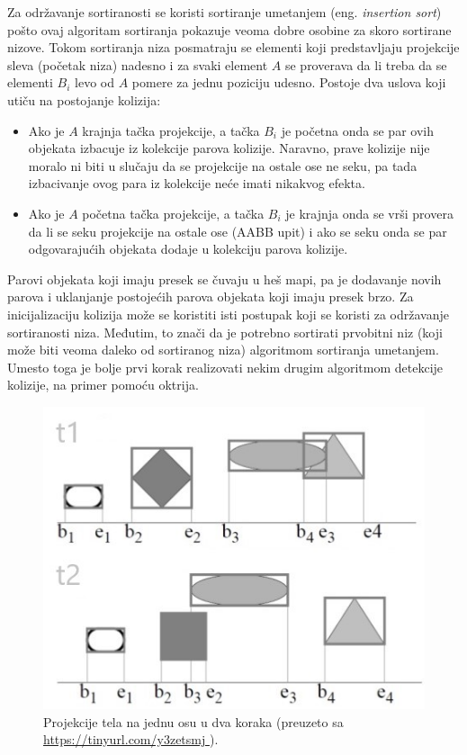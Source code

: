 \documentclass[12pt,oneside]{memoir}
\begin{document}
Za održavanje sortiranosti se koristi sortiranje umetanjem (eng. {\em insertion sort}) 
pošto ovaj algoritam sortiranja pokazuje veoma dobre osobine za skoro sortirane nizove.
Tokom sortiranja niza posmatraju se elementi koji predstavljaju projekcije sleva (početak niza) nadesno i za svaki element $A$ se proverava da li treba da se elementi $B_i$ levo od $A$
pomere za jednu poziciju udesno. Postoje dva uslova koji utiču na postojanje kolizija:
\begin{itemize}  
	\item Ako je $A$ krajnja tačka projekcije, a tačka $B_i$ je početna onda se par ovih objekata izbacuje iz kolekcije parova kolizije.
	Naravno, prave kolizije nije moralo ni biti u slučaju da se projekcije na ostale ose ne seku, 
	pa tada izbacivanje ovog para iz kolekcije neće imati nikakvog efekta.
	\item Ako je $A$ početna tačka projekcije, a tačka $B_i$ je krajnja onda se vrši provera da li se seku projekcije na ostale ose (AABB upit) i ako se seku
	onda se par odgovarajućih objekata dodaje u kolekciju parova kolizije.

\end{itemize}  

Parovi objekata koji imaju presek se čuvaju u heš mapi, pa je dodavanje novih parova i uklanjanje postojećih parova objekata koji imaju presek brzo.
Za inicijalizaciju kolizija može se koristiti isti postupak koji se koristi za održavanje sortiranosti niza.
Međutim, to znači da je potrebno sortirati prvobitni niz (koji može biti veoma daleko od sortiranog niza) algoritmom sortiranja umetanjem.
Umesto toga je bolje prvi korak realizovati nekim drugim algoritmom detekcije kolizije, na primer pomoću oktrija.

\begin{figure}[h!]
	\centering
	\includegraphics[scale=0.8]{sap.jpg}
	\caption{Projekcije tela na jednu osu u dva koraka (preuzeto sa \url{ https://tinyurl.com/y3zetsmj }).}
	
	\label{fig:sap}
\end{figure}
\end{document}
